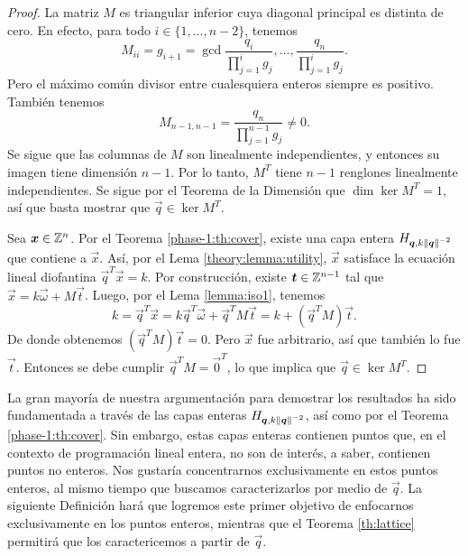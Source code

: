 \begin{proof}
	La matriz $M$ es triangular inferior cuya diagonal principal es distinta de cero. En efecto,
	para todo $i \in \lbrace 1, \ldots, n - 2\rbrace$, tenemos
	\begin{equation*}
		M_{ii} = g_{i + 1} = \gcd{\frac{q_i}{\prod_{j=1}^{i}g_j}, \ldots,
		\frac{q_n}{\prod_{j=1}^{i}g_j}}.
	\end{equation*}
	Pero el máximo común divisor entre cualesquiera enteros siempre es positivo. También tenemos
	\begin{equation*}
		M_{n-1, n-1} = \frac{q_n}{\prod_{j=1}^{n-1}g_j} \neq 0.
	\end{equation*}
	Se sigue que las columnas de $M$ son linealmente
	independientes, y entonces su imagen tiene dimensión $n - 1$. Por lo tanto, $M^T$ tiene $n - 1$
	renglones linealmente independientes. Se sigue por el Teorema de la Dimensión que $\dim
	\ker{M^T} = 1$, así que basta mostrar que $\vec{q} \in \ker{M^T}$.

	Sea $\boldsymbol{x} \in \mathbb{Z}^n$. Por el Teorema \ref{phase-1:th:cover}, existe una capa entera
	$H_{\boldsymbol{q}, k\left\lVert \boldsymbol{q} \right\rVert^{-2}}$ que contiene a $\vec{x}$. Así, por el Lema
	\ref{theory:lemma:utility}, $\vec{x}$ satisface la
	ecuación lineal diofantina $\vec{q}^T\vec{x} = k$. Por construcción, existe $\boldsymbol{t} \in
	\mathbb{Z}^{n-1}$ tal que $\vec{x} = k\vec{\omega} + M\vec{t}$. Luego, por el Lema \ref{lemma:iso1},
	tenemos
	\begin{equation*}
		k = \vec{q}^T\vec{x} = k \vec{q}^T\vec{\omega} + \vec{q}^TM\vec{t} = k +
		(\vec{q}^TM)\vec{t}.
	\end{equation*}
	De donde obtenemos $(\vec{q}^TM)\vec{t} = 0$. Pero $\vec{x}$ fue arbitrario, así que también lo
	fue $\vec{t}$. Entonces se debe cumplir $\vec{q}^TM = \vec{0}^T$, lo que implica que $\vec{q} \in
	\ker{M^T}$.
\end{proof}

La gran mayoría de nuestra argumentación para demostrar los resultados ha sido fundamentada a través
de las capas enteras $H_{\boldsymbol{q}, k\left\lVert \boldsymbol{q} \right\rVert^{-2}}$, así como por el Teorema
\ref{phase-1:th:cover}. Sin embargo, estas capas enteras contienen puntos que, en el contexto de
programación lineal entera, no son de interés, a saber, contienen puntos no enteros. Nos gustaría
concentrarnos exclusivamente en estos puntos enteros, al mismo tiempo que buscamos caracterizarlos
por medio de $\vec{q}$. La siguiente Definición hará que logremos este primer objetivo de enfocarnos
exclusivamente en los puntos enteros, mientras que el Teorema \ref{th:lattice} permitirá que los
caractericemos a partir de $\vec{q}$.

